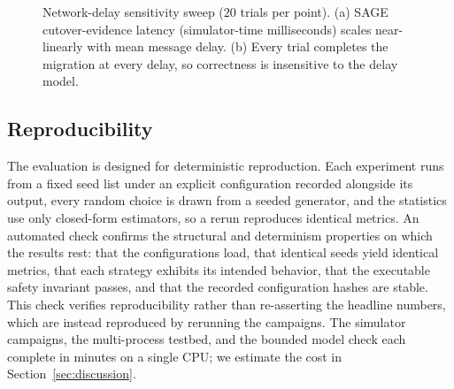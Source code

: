 \documentclass[journal]{IEEEtran}
\theoremstyle{definition}
\theoremstyle{remark}
\begin{document}
\begin{figure}[t]
\centering
{}
\caption{Network-delay sensitivity sweep ($20$ trials per point). (a) SAGE
cutover-evidence latency (simulator-time milliseconds) scales near-linearly with mean message
delay. (b) Every trial completes the migration at every delay, so correctness is insensitive to
the delay model.}
\label{fig:sens}
\end{figure}

\subsection{Reproducibility}
The evaluation is designed for deterministic reproduction. Each experiment runs from a fixed seed
list under an explicit configuration recorded alongside its output, every random choice is drawn
from a seeded generator, and the statistics use only closed-form estimators, so a rerun reproduces
identical metrics. An automated check confirms the structural and determinism properties on which
the results rest: that the configurations load, that identical seeds yield identical metrics, that
each strategy exhibits its intended behavior, that the executable safety invariant passes, and
that the recorded configuration hashes are stable. This check verifies reproducibility rather than
re-asserting the headline numbers, which are instead reproduced by rerunning the campaigns. The
simulator campaigns, the multi-process testbed, and the bounded model check each complete in
minutes on a single CPU; we estimate the cost in Section~\ref{sec:discussion}.
\end{document}

